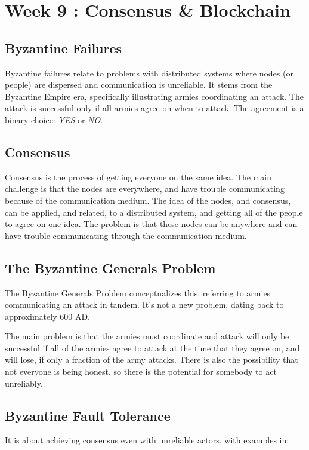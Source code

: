 \section{Week 9 : Consensus \& Blockchain}
\subsection{Byzantine Failures}
Byzantine failures relate to problems with distributed systems where nodes (or people) are dispersed and communication is unreliable. It stems from the Byzantine Empire era, specifically illustrating armies coordinating an attack. The attack is successful only if all armies agree on when to attack. The agreement is a binary choice: \textit{YES} or \textit{NO}.

\subsection{Consensus}

Consensus is the process of getting everyone on the same idea. The main challenge is that the nodes are everywhere, and have trouble communicating because of the communication medium. The idea of the nodes, and consensus, can be applied, and related, to a distributed system, and getting all of the people to agree on one idea. The problem is that these nodes can be anywhere and can have trouble communicating through the communication medium.

\subsection{The Byzantine Generals Problem}
The Byzantine Generals Problem conceptualizes this, referring to armies communicating an attack in tandem. It’s not a new problem, dating back to approximately 600 AD.

The main problem is that the armies must coordinate and attack will only be successful if all of the armies agree to attack at the time that they agree on, and will lose, if only a fraction of the army attacks. There is also the possibility that not everyone is being honest, so there is the potential for somebody to act unreliably.

\subsection{Byzantine Fault Tolerance}
It is about achieving consensus even with unreliable actors, with examples in:

